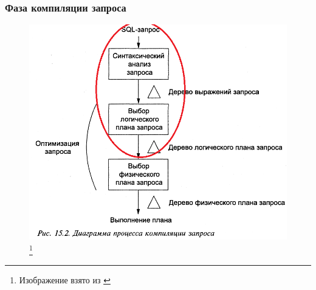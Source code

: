 \documentclass{beamer}
\begin{document}
\begin{frame}
\frametitle{Фаза компиляции запроса}

\begin{figure}[htb]
\includegraphics[width=\textwidth,height=0.8\textheight,keepaspectratio]{query-to-execution-circle.png} 
\footnote{\tiny{Изображение взято из \cite{Ulman2004}}}
\end{figure}

\end{frame}
\end{document}
